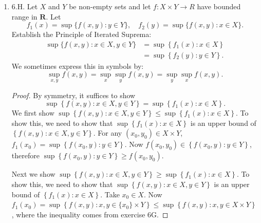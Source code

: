 \begin{enumerate}
\begin{proof}
	It suffices to show that $\operatorname{inf}S$ is a lower bound of $S_0$. By definition, for all $x \in  S$, $x\ge \operatorname{inf}S$. Take $s \in  S_0$. Since $S_0 \subset S$, $s \in  S$. Therefore, $s\ge \operatorname{inf}S$.
\end{proof}
	\item 6.H. Let $X$ and $Y$ be non-empty sets and let $f: X \times Y \rightarrow R$ have bounded range in $\boldsymbol{R}$. Let
\[
f_{1}(x)=\sup \{f(x, y): y \in Y\}, \quad f_{2}(y)=\sup \{f(x, y): x \in X\} .
\]
Establish the Principle of Iterated Suprema:
\[
\begin{aligned}
\sup \{f(x, y): x \in X, y \in Y\} &=\sup \left\{f_{1}(x): x \in X\right\} \\
&=\sup \left\{f_{2}(y): y \in Y\right\} .
\end{aligned}
\]
We sometimes express this in symbols by:
\[
\sup _{x, y} f(x, y)=\sup _{x} \sup _{y} f(x, y)=\sup _{y} \sup _{x} f(x, y) .
\]
\begin{proof}
	By symmetry, it suffices to show \[
	\sup \left\{ f(x, y): x \in X, y \in Y\right\}=\sup \left\{f_{1}(x): x \in X\right\}
. \]
	We first show $\sup \left\{ f(x, y): x \in X, y \in Y\right\}\le \sup \left\{f_{1}(x): x \in X\right\}$.
	To show this, we need to show that $ \sup \left\{f_{1}(x): x \in X\right\}$ is an upper bound of $ \left\{ f(x, y): x \in X, y \in Y\right\}$. For any $(x_0,y_0) \in  X \times Y$, $f_1(x_0) = \sup \left\{ f(x_0,y):y \in  Y \right\} $. Now $f(x_0,y_0) \in \left\{ f(x_0,y):y \in  Y \right\}$, therefore $\sup \left\{ f(x_0,y):y \in  Y \right\} \ge f(x_0,y_0)$.

	Next we show $\sup \left\{ f(x, y): x \in X, y \in Y\right\}\ge \sup \left\{f_{1}(x): x \in X\right\}$.
	To show this, we need to show that $\sup \left\{ f(x, y): x \in X, y \in Y\right\}$ is an upper bound of $\left\{f_{1}(x): x \in X\right\}$.
	Take  $x_0 \in  X$. Now $f_1(x_0) = \sup \left\{ f(x,y): x,y \in \{x_0 \} \times Y \right\} \le \sup \left\{ f(x,y): x,y \in X \times Y \right\} $, where the inequality comes from exercise 6G.
\end{proof}
\end{enumerate}
